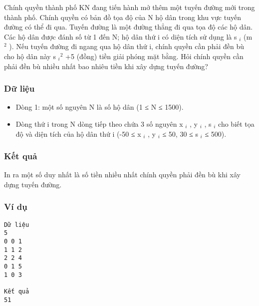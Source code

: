 



   Chính quyền thành phố KN đang tiến hành mở thêm một tuyến đường mới trong thành phố. Chính quyền có bản đồ tọa độ của N hộ dân trong khu vực tuyến đường có thể đi qua. Tuyến đường là một đường thẳng đi qua tọa độ các hộ dân. Các hộ dân được đánh số từ 1 đến N; hộ dân thứ i có diện tích sử dụng là s   $_    i   $   (m   $^    2   $   ). Nếu tuyến đường đi ngang qua hộ dân thứ i, chính quyền cần phải đền bù cho hộ dân này s   $_    i   $$^    2   $   +5 (đồng) tiền giải phóng mặt bằng. Hỏi chính quyền cần phải đền bù nhiều nhất bao nhiêu tiền khi xây dựng tuyến đường?  

\subsubsection{   Dữ liệu  }
\begin{itemize}
	\item     Dòng 1: một số nguyên N là số hộ dân (1 ≤ N ≤ 1500).   
	\item     Dòng thứ i trong N dòng tiếp theo chứa 3 số nguyên x    $_     i    $    , y    $_     i    $    , s    $_     i    $    cho biết tọa độ và diện tích của hộ dân thứ i (-50 ≤ x    $_     i    $    , y    $_     i    $    ≤ 50, 30 ≤ s    $_     i    $    ≤ 500).   
\end{itemize}

\subsubsection{   Kết quả  }

   In ra một số duy nhất là số tiền nhiều nhất chính quyền phải đền bù khi xây dựng tuyến đường.  

\subsubsection{   Ví dụ  }
\begin{verbatim}
Dữ liệu
5
0 0 1
1 1 2
2 2 4
0 1 5
1 0 3

Kết quả	
51
\end{verbatim}